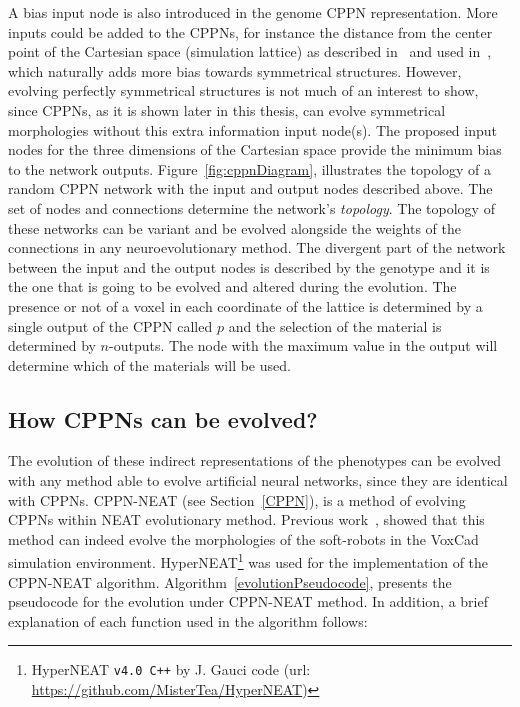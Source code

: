 A bias input node is also introduced in the genome CPPN representation. More inputs could be added to the CPPNs, for instance the distance from the center point of the Cartesian space (simulation lattice) as described in~\citep{stanley2007compositional} and used in~\citep{cheney2013unshackling}, which naturally adds more bias towards symmetrical structures. However, evolving perfectly symmetrical structures is not much of an interest to show, since CPPNs, as it is shown later in this thesis, can evolve symmetrical morphologies without this extra information input node(s). The proposed input nodes for the three dimensions of the Cartesian space provide the minimum bias to the network outputs. Figure~\ref{fig:cppnDiagram}, illustrates the topology of a random CPPN network with the input and output nodes described above. The set of nodes and connections determine the network's \emph{topology}. The topology of these networks can be variant and be evolved alongside the weights of the connections in any neuroevolutionary method. The divergent part of the network between the input and the output nodes is described by the genotype and it is the one that is going to be evolved and altered during the evolution. The presence or not of a voxel in each coordinate of the lattice is determined by a single output of the CPPN called $p$ and the selection of the material is determined by $n$-outputs. The node with the maximum value in the output will determine which of the materials will be used.

\subsection{How CPPNs can be evolved?}

The evolution of these indirect representations of the phenotypes can be evolved with any method able to evolve artificial neural networks, since they are identical with CPPNs. CPPN-NEAT (see Section~\ref{CPPN}), is a method of evolving CPPNs within NEAT evolutionary method. Previous work~\citep{cheney2013unshackling}, showed that this method can indeed evolve the morphologies of the soft-robots in the VoxCad simulation environment. HyperNEAT\footnote{HyperNEAT \texttt{v4.0 C++} by J. Gauci code (url: \url{https://github.com/MisterTea/HyperNEAT})} was used for the implementation of the CPPN-NEAT algorithm. Algorithm~\ref{evolutionPseudocode}, presents the pseudocode for the evolution under CPPN-NEAT method. In addition, a brief explanation of each function used in the algorithm follows:


